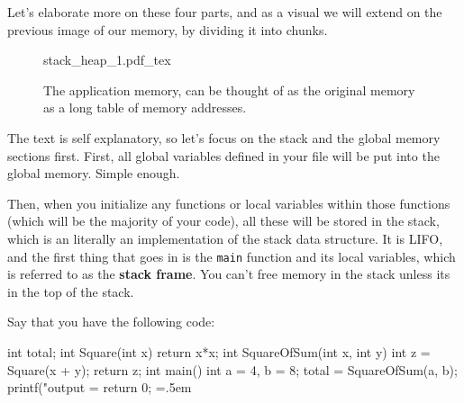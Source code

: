\documentclass{article}
\theoremstyle{definition}
\newenvironment{cverbatim}
   {\SaveVerbatim{cverb}}
   {\endSaveVerbatim
    \flushleft\fboxrule=0pt\fboxsep=.5em
    \colorbox{cverbbg}{%
      \makebox[\dimexpr\linewidth-2\fboxsep][l]{\BUseVerbatim{cverb}}%
    }
    \endflushleft
  }
\newcommand{\incfig}[2][1]{%
    \def\svgwidth{#1\columnwidth}
    {#2.pdf\_tex}
  }
\begin{document}
    Let's elaborate more on these four parts, and as a visual we will extend on the previous image of our memory, by dividing it into chunks. 

    \begin{figure}[ht]
      \centering
      \incfig{stack_heap_1}
      \caption{The application memory, can be thought of as the original memory as a long table of memory addresses. }
      \label{fig:stack_heap_1}
    \end{figure}

    The text is self explanatory, so let's focus on the stack and the global memory sections first. First, all global variables defined in your file will be put into the global memory. Simple enough. 

    Then, when you initialize any functions or local variables within those functions (which will be the majority of your code), all these will be stored in the stack, which is an literally an implementation of the stack data structure. It is LIFO, and the first thing that goes in is the \texttt{main} function and its local variables, which is referred to as the \textbf{stack frame}. You can't free memory in the stack unless its in the top of the stack. 

    Say that you have the following code: 

    \begin{cverbatim} 
      int total; 
      int Square(int x) {
        return x*x; 
      }
      int SquareOfSum(int x, int y) {
        int z = Square(x + y); 
        return z; 
      }
      int main() { 
        int a = 4, b = 8;              
        total = SquareOfSum(a, b); 
        printf("output = %
        return 0; 
      }
    \end{cverbatim}
    
\end{document}
